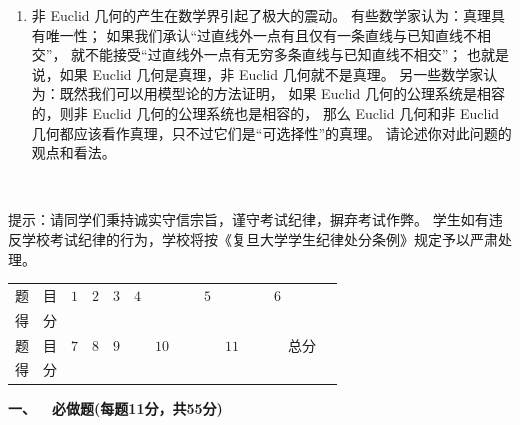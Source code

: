 \begin{enumerate}
    \item 非 Euclid 几何的产生在数学界引起了极大的震动。
    有些数学家认为：真理具有唯一性；
    如果我们承认“过直线外一点有且仅有一条直线与已知直线不相交”，
    就不能接受“过直线外一点有无穷多条直线与已知直线不相交”；
    也就是说，如果 Euclid 几何是真理，非 Euclid 几何就不是真理。
    另一些数学家认为：既然我们可以用模型论的方法证明，
    如果 Euclid 几何的公理系统是相容的，则非 Euclid 几何的公理系统也是相容的，
    那么 Euclid 几何和非 Euclid 几何都应该看作真理，只不过它们是“可选择性”的真理。
    请论述你对此问题的观点和看法。
\end{enumerate}
~\\

\begin{center}

\end{center}

\qquad 提示：请同学们秉持诚实守信宗旨，谨守考试纪律，摒弃考试作弊。
学生如有违反学校考试纪律的行为，学校将按《复旦大学学生纪律处分条例》规定予以严肃处理。

\begin{table}
\begin{tabular}{|c|c|c|c|}
题\ \ 目 &\quad$1$\quad&\quad$2$\quad&\quad$3$\quad&\quad$4$\quad&\quad$5$\quad&\quad$6$\quad\\
得\ \ 分 & & & & & & \\
题\ \ 目 &\quad$7$\quad&\quad$8$\quad&\quad$9$\quad&\ \ \ $10$\ \ \ &\ \ \ $11$\ \ \ &\ \ 总分\ \ \\
得\ \ 分 & & & & & & 
\end{tabular}
\end{table}

\textbf{一、\ \ 必做题(每题11分，共55分)}

